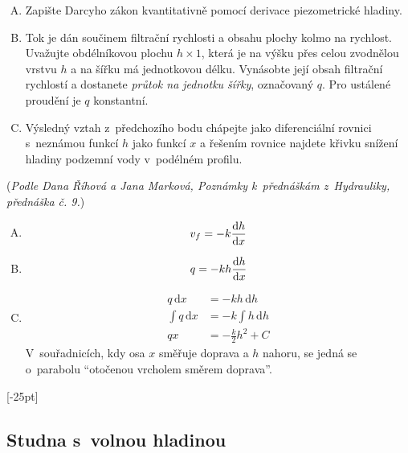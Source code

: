   \vspace*{-15pt}
\begin{enumerate}[A)] pt
\item Zapište Darcyho zákon kvantitativně pomocí derivace piezometrické hladiny. 
\item Tok je dán součinem filtrační rychlosti a obsahu plochy kolmo na
  rychlost. Uvažujte obdélníkovou plochu $h\times 1$, která je na výšku přes celou
  zvodnělou vrstvu $h$ a na šířku má jednotkovou délku. Vynásobte její obsah 
  filtrační rychlostí a dostanete \textit{průtok na jednotku šířky}, označovaný
  $q$. Pro ustálené proudění je $q$ konstantní.
\item Výsledný vztah z předchozího bodu chápejte jako diferenciální rovnici s neznámou funkcí $h$ jako funkcí $x$ a řešením rovnice najdete křivku snížení hladiny podzemní vody v podélném profilu. 
\end{enumerate}

(\textit{Podle Dana Říhová a Jana Marková, Poznámky k přednáškám z Hydrauliky, přednáška č. 9.})

\reseni

\begin{enumerate}[A)]
  \item  $$v_f=-k\frac{\mathrm{d}h}{\mathrm{d}x}$$
  \item $$q=-kh\frac{\mathrm{d}h}{\mathrm{d}x}$$
  \item $$
    \begin{aligned}
      q\,\mathrm{d}x&=-kh\,\mathrm dh\\
      \int q\,\mathrm{d}x&=-k \int h\,\mathrm dh\\
      qx&=-\frac k2 h^2+C
    \end{aligned}
    $$
    V souřadnicích, kdy osa $x$ směřuje doprava a $h$ nahoru, se jedná
    se o parabolu ``otočenou vrcholem směrem doprava''.
\end{enumerate}
\konec



[-25pt]


\subsection{Studna s volnou hladinou}

